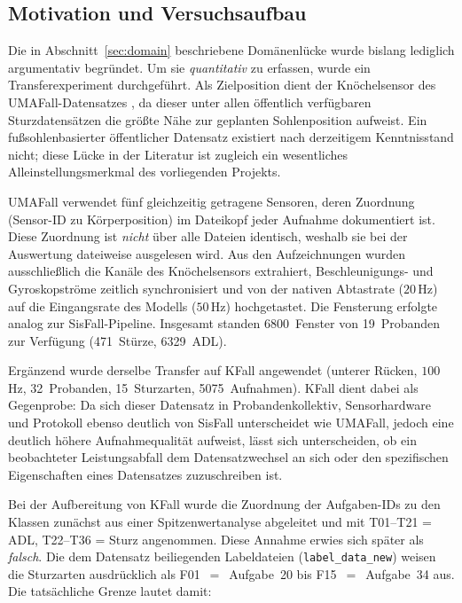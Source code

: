 \documentclass[11pt,a4paper,oneside]{report}
\begin{document}
\subsection{Motivation und Versuchsaufbau}

Die in Abschnitt~\ref{sec:domain} beschriebene Domänenlücke wurde
bislang lediglich argumentativ begründet. Um sie \emph{quantitativ} zu
erfassen, wurde ein Transferexperiment durchgeführt. Als Zielposition
dient der Knöchelsensor des UMAFall-Datensatzes \cite{umafall2017},
da dieser unter allen öffentlich verfügbaren Sturzdatensätzen die
größte Nähe zur geplanten Sohlenposition aufweist. Ein
fußsohlenbasierter öffentlicher Datensatz existiert nach derzeitigem
Kenntnisstand nicht; diese Lücke in der Literatur ist zugleich ein
wesentliches Alleinstellungsmerkmal des vorliegenden Projekts.

UMAFall verwendet fünf gleichzeitig getragene Sensoren, deren
Zuordnung (Sensor-ID zu Körperposition) im Dateikopf jeder Aufnahme
dokumentiert ist. Diese Zuordnung ist \emph{nicht} über alle Dateien
identisch, weshalb sie bei der Auswertung dateiweise ausgelesen wird.
Aus den Aufzeichnungen wurden ausschließlich die Kanäle des
Knöchelsensors extrahiert, Beschleunigungs- und Gyroskopströme
zeitlich synchronisiert und von der nativen Abtastrate ($20$\,Hz) auf
die Eingangsrate des Modells ($50$\,Hz) hochgetastet. Die Fensterung
erfolgte analog zur SisFall-Pipeline. Insgesamt standen
6800~Fenster von 19~Probanden zur Verfügung (471~Stürze, 6329~ADL).

Ergänzend wurde derselbe Transfer auf KFall \cite{kfall2021}
angewendet (unterer Rücken, $100$\,Hz, 32~Probanden, 15~Sturzarten,
5075~Aufnahmen). KFall dient dabei als Gegenprobe: Da sich dieser
Datensatz in Probandenkollektiv, Sensorhardware und Protokoll
ebenso deutlich von SisFall unterscheidet wie UMAFall, jedoch eine
deutlich höhere Aufnahmequalität aufweist, lässt sich unterscheiden,
ob ein beobachteter Leistungsabfall dem Datensatzwechsel an sich oder
den spezifischen Eigenschaften eines Datensatzes zuzuschreiben ist.

Bei der Aufbereitung von KFall wurde die Zuordnung der Aufgaben-IDs
zu den Klassen zunächst aus einer Spitzenwertanalyse abgeleitet und
mit T01--T21 = ADL, T22--T36 = Sturz angenommen. Diese Annahme
erwies sich später als \emph{falsch}. Die dem Datensatz beiliegenden
Labeldateien (\texttt{label\_data\_new}) weisen die Sturzarten
ausdrücklich als F01~$=$~Aufgabe~20 bis F15~$=$~Aufgabe~34 aus. Die
tatsächliche Grenze lautet damit:
\end{document}
